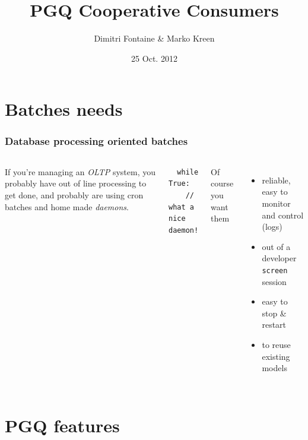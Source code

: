 \documentclass{beamer}
\title{PGQ Cooperative Consumers}
\author{Dimitri Fontaine \& Marko Kreen}
\date{25 Oct. 2012}
\begin{document}
\frame{\titlepage}

\section{Batches needs}

\begin{frame}[fragile]
  \frametitle{Database processing oriented batches}

\begin{columns}[c]


If you're managing an \textit{OLTP} system, you probably have out of line
processing to get done, and probably are using cron batches and home made
\textit{daemons}.

\pause
\begin{example}
\begin{verbatim}
  while True: 
    // what a nice daemon!
\end{verbatim}
\end{example}

\pause
{} 
  Of course you want them 
  \begin{itemize}
   \item reliable, easy to monitor and control (logs)
   \item out of a developer \texttt{screen} session
   \item easy to stop \& restart
   \item to reuse existing models
  \end{itemize}

\end{columns}
\end{frame}

\section{PGQ features}
\end{document}
